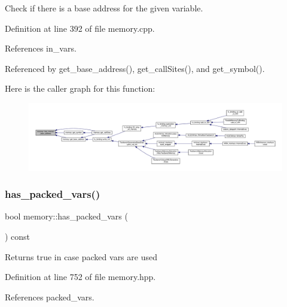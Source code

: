 Check if there is a base address for the given variable. 



Definition at line 392 of file memory.\+cpp.



References in\+\_\+vars.



Referenced by get\+\_\+base\+\_\+address(), get\+\_\+call\+Sites(), and get\+\_\+symbol().

Here is the caller graph for this function\+:
\nopagebreak
\begin{figure}[H]
\begin{center}
\leavevmode
\includegraphics[width=350pt]{d8/d99/classmemory_a7008ca7ac0edcff1f6bece9751e46eac_icgraph}
\end{center}
\end{figure}
\mbox{\label{classmemory_a454bcd8827a81dcc3ecc07cee955bdb6}} 
\subsubsection{\texorpdfstring{has\+\_\+packed\+\_\+vars()}{has\_packed\_vars()}}
{\footnotesize\ttfamily bool memory\+::has\+\_\+packed\+\_\+vars (\begin{DoxyParamCaption}{ }\end{DoxyParamCaption}) const\hspace{0.3cm}{\ttfamily [inline]}}

\begin{DoxyReturn}{Returns}
true in case packed vars are used 
\end{DoxyReturn}


Definition at line 752 of file memory.\+hpp.



References packed\+\_\+vars.

\mbox{\label{classmemory_af2a8ffe8b46caad910fa15fd4b682fed}} 
